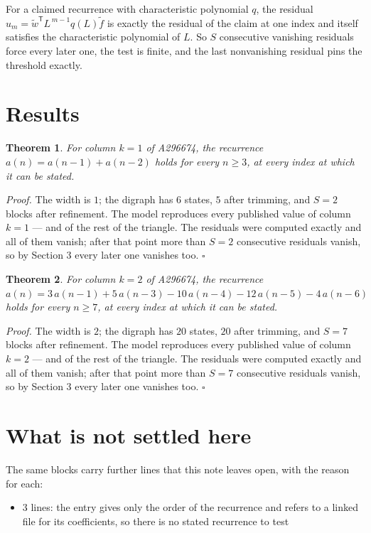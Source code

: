 \documentclass[11pt]{article}
\newtheorem{theorem}{Theorem}
\theoremstyle{definition}
\begin{document}
For a claimed recurrence with characteristic polynomial $q$, the residual $u_m = \tilde w^{\mathsf T}L^{\,m-1}q(L)\tilde f$ is exactly the residual of the claim at one index and itself satisfies the characteristic polynomial of $L$. So $S$ consecutive vanishing residuals force every later one, the test is finite, and the last nonvanishing residual pins the threshold exactly.

\section{Results}

\begin{theorem} For column $k = 1$ of A296674, the recurrence $a(n) = a(n-1) + a(n-2)$ holds for every $n \ge 3$, at every index at which it can be stated.\end{theorem}

{\itshape Proof.} The width is $1$; the digraph has $6$ states, $5$ after trimming, and $S = 2$ blocks after refinement. The model reproduces every published value of column $k = 1$ --- and of the rest of the triangle. The residuals were computed exactly and all of them vanish; after that point more than $S = 2$ consecutive residuals vanish, so by Section 3 every later one vanishes too. $\square$

\begin{theorem} For column $k = 2$ of A296674, the recurrence $a(n) = 3\,a(n-1) + 5\,a(n-3) - 10\,a(n-4) - 12\,a(n-5) - 4\,a(n-6)$ holds for every $n \ge 7$, at every index at which it can be stated.\end{theorem}

{\itshape Proof.} The width is $2$; the digraph has $20$ states, $20$ after trimming, and $S = 7$ blocks after refinement. The model reproduces every published value of column $k = 2$ --- and of the rest of the triangle. The residuals were computed exactly and all of them vanish; after that point more than $S = 7$ consecutive residuals vanish, so by Section 3 every later one vanishes too. $\square$

\section{What is not settled here}

The same blocks carry further lines that this note leaves open, with the reason for each:

\begin{itemize}

\item 3 lines: the entry gives only the order of the recurrence and refers to a linked file for its coefficients, so there is no stated recurrence to test

\end{itemize}
\end{document}
